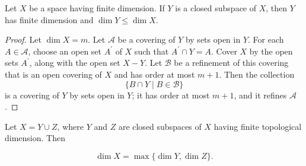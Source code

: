 \begin{theorem}
\label{thm:\thetheorem}
Let \(X\) be a space having finite dimension. If \(Y\) is a closed subspace of \(X\), then \(Y\) has finite dimension and \(\dim Y \leq \dim X\).
\end{theorem}

\begin{proof}
Let \(\dim X = m\). Let \(\mathcal{A}\) be a covering of \(Y\) by sets open in \(Y\). For each \(A \in \mathcal{A}\), choose an open set \(A^{\prime }\) of \(X\) such that \(A^{\prime } \cap Y = A\). Cover \(X\) by the open sets \(A^{\prime }\), along with the open set \(X - Y\). Let \(\mathcal{B}\) be a refinement of this covering that is an open covering of \(X\) and has order at most \(m + 1\). Then the collection
\[
\{ B \cap Y \mid B \in \mathcal{B}\}
\]
is a covering of \(Y\) by sets open in \(Y\); it has order at most \(m + 1\), and it refines \(\mathcal{A}\).
\end{proof}
\begin{theorem}
\label{thm:\thetheorem}
Let \(X = Y \cup Z\), where \(Y\) and \(Z\) are closed subspaces of \(X\) having finite topological dimension. Then

\[
\dim X = \max \{ \dim Y,\dim Z\}.
\]
\end{theorem}

